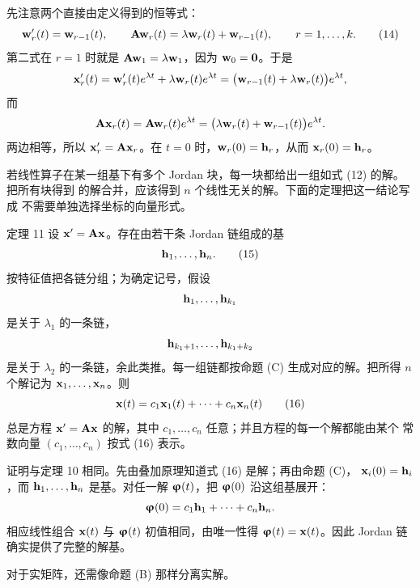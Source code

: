 先注意两个直接由定义得到的恒等式：
\begin{equation}
 \vect{w}_r'(t)=\vect{w}_{r-1}(t),\qquad
 \mat{A}\vect{w}_r(t)=\lambda \vect{w}_r(t)+\vect{w}_{r-1}(t),
 \qquad r=1,\ldots,k.
 \tag{14}
\end{equation}
第二式在 \(r=1\) 时就是 \(\mat{A}\vect{w}_1=\lambda \vect{w}_1\)，因为 \(\vect{w}_0=\vect{0}\)。于是
\[
 \vect{x}_r'(t)
 =\vect{w}_r'(t)e^{\lambda t}+\lambda \vect{w}_r(t)e^{\lambda t}
 =\bigl(\vect{w}_{r-1}(t)+\lambda \vect{w}_r(t)\bigr)e^{\lambda t},
\]
而
\[
 \mat{A}\vect{x}_r(t)=\mat{A}\vect{w}_r(t)e^{\lambda t}
 =\bigl(\lambda \vect{w}_r(t)+\vect{w}_{r-1}(t)\bigr)e^{\lambda t}.
\]
两边相等，所以 \(\vect{x}_r'=\mat{A}\vect{x}_r\)。在 \(t=0\) 时，\(\vect{w}_r(0)=\vect{h}_r\)，从而
\(\vect{x}_r(0)=\vect{h}_r\)。

若线性算子在某一组基下有多个 Jordan 块，每一块都给出一组如式 (12) 的解。把所有块得到
的解合并，应该得到 \(n\) 个线性无关的解。下面的定理把这一结论写成
不需要单独选择坐标的向量形式。

\begin{sourceitem}{定理 11}
设 \(\vect{x}'=\mat{A}\vect{x}\)。存在由若干条 Jordan 链组成的基
\begin{equation}
 \vect{h}_1,\ldots,\vect{h}_n.
 \tag{15}
\end{equation}
按特征值把各链分组；为确定记号，假设
\[
 \vect{h}_1,\ldots,\vect{h}_{k_1}
\]
是关于 \(\lambda_1\) 的一条链，
\[
 \vect{h}_{k_1+1},\ldots,\vect{h}_{k_1+k_2}
\]
是关于 \(\lambda_2\) 的一条链，余此类推。每一组链都按命题 (C) 生成对应的解。把所得
\(n\) 个解记为 \(\vect{x}_1,\ldots,\vect{x}_n\)。则
\begin{equation}
 \vect{x}(t)=c_1\vect{x}_1(t)+\cdots+c_n\vect{x}_n(t)
 \tag{16}
\end{equation}
总是方程 \(\vect{x}'=\mat{A}\vect{x}\) 的解，其中 \(c_1,\ldots,c_n\) 任意；并且方程的每一个解都能由某个
常数向量 \((c_1,\ldots,c_n)\) 按式 (16) 表示。
\end{sourceitem}

证明与定理 10 相同。先由叠加原理知道式 (16) 是解；再由命题 (C)，
\(\vect{x}_i(0)=\vect{h}_i\)，而 \(\vect{h}_1,\ldots,\vect{h}_n\) 是基。对任一解 \(\vect{\varphi}(t)\)，把
\(\vect{\varphi}(0)\) 沿这组基展开：
\[
 \vect{\varphi}(0)=c_1\vect{h}_1+\cdots+c_n\vect{h}_n.
\]
相应线性组合 \(\vect{x}(t)\) 与 \(\vect{\varphi}(t)\) 初值相同，由唯一性得
\(\vect{\varphi}(t)=\vect{x}(t)\)。因此 Jordan 链确实提供了完整的解基。

对于实矩阵，还需像命题 (B) 那样分离实解。

